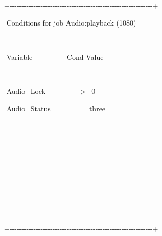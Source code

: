 \begin{exparasmall}

\ +-{}-{}-{}-{}-{}-{}-{}-{}-{}-{}-{}-{}-{}-{}-{}-{}-{}-{}-{}-{}-{}-{}-{}-{}-{}-{}-{}-{}-{}-{}-{}-{}-{}-{}-{}-{}-{}-{}-{}-{}-{}-{}-{}-{}-{}-{}-{}-{}-{}-{}-{}-{}-{}-{}-{}-{}-{}-{}-{}-+

\ {\textbar} Conditions for job
{\textasciigrave}Audio:playback{\textquotesingle} (1080)
\ \ \ \ \ \ \ \ \ \ \ \ \ \ \ \ {\textbar}

\ {\textbar}
\ \ \ \ \ \ \ \ \ \ \ \ \ \ \ \ \ \ \ \ \ \ \ \ \ \ \ \ \ \ \ \ \ \ \ \ \ \ \ \ \ \ \ \ \ \ \ \ \ \ \ \ \ \ \ \ \ \ \ {\textbar}

\ {\textbar} Variable \ \ \ \ \ \ \ \ \ Cond Value
\ \ \ \ \ \ \ \ \ \ \ \ \ \ \ \ \ \ \ \ \ \ \ \ \ \ \ \ \ \ {\textbar}

\ {\textbar}
\ \ \ \ \ \ \ \ \ \ \ \ \ \ \ \ \ \ \ \ \ \ \ \ \ \ \ \ \ \ \ \ \ \ \ \ \ \ \ \ \ \ \ \ \ \ \ \ \ \ \ \ \ \ \ \ \ \ \ {\textbar}

\ {\textbar} Audio\_Lock \ \ \ \ \ \ \ \ \ {\textgreater} \ 0
\ \ \ \ \ \ \ \ \ \ \ \ \ \ \ \ \ \ \ \ \ \ \ \ \ \ \ \ \ \ \ \ \ \ {\textbar}

\ {\textbar} Audio\_Status \ \ \ \ \ \ \ =
\ {\textquotedbl}three{\textquotedbl}
\ \ \ \ \ \ \ \ \ \ \ \ \ \ \ \ \ \ \ \ \ \ \ \ \ \ \ \ {\textbar}

\ {\textbar}
\ \ \ \ \ \ \ \ \ \ \ \ \ \ \ \ \ \ \ \ \ \ \ \ \ \ \ \ \ \ \ \ \ \ \ \ \ \ \ \ \ \ \ \ \ \ \ \ \ \ \ \ \ \ \ \ \ \ \ {\textbar}

\ {\textbar}
\ \ \ \ \ \ \ \ \ \ \ \ \ \ \ \ \ \ \ \ \ \ \ \ \ \ \ \ \ \ \ \ \ \ \ \ \ \ \ \ \ \ \ \ \ \ \ \ \ \ \ \ \ \ \ \ \ \ \ {\textbar}

\ {\textbar}
\ \ \ \ \ \ \ \ \ \ \ \ \ \ \ \ \ \ \ \ \ \ \ \ \ \ \ \ \ \ \ \ \ \ \ \ \ \ \ \ \ \ \ \ \ \ \ \ \ \ \ \ \ \ \ \ \ \ \ {\textbar}

\ {\textbar}
\ \ \ \ \ \ \ \ \ \ \ \ \ \ \ \ \ \ \ \ \ \ \ \ \ \ \ \ \ \ \ \ \ \ \ \ \ \ \ \ \ \ \ \ \ \ \ \ \ \ \ \ \ \ \ \ \ \ \ {\textbar}

\ {\textbar}
\ \ \ \ \ \ \ \ \ \ \ \ \ \ \ \ \ \ \ \ \ \ \ \ \ \ \ \ \ \ \ \ \ \ \ \ \ \ \ \ \ \ \ \ \ \ \ \ \ \ \ \ \ \ \ \ \ \ \ {\textbar}

\ {\textbar}
\ \ \ \ \ \ \ \ \ \ \ \ \ \ \ \ \ \ \ \ \ \ \ \ \ \ \ \ \ \ \ \ \ \ \ \ \ \ \ \ \ \ \ \ \ \ \ \ \ \ \ \ \ \ \ \ \ \ \ {\textbar}

\ +-{}-{}-{}-{}-{}-{}-{}-{}-{}-{}-{}-{}-{}-{}-{}-{}-{}-{}-{}-{}-{}-{}-{}-{}-{}-{}-{}-{}-{}-{}-{}-{}-{}-{}-{}-{}-{}-{}-{}-{}-{}-{}-{}-{}-{}-{}-{}-{}-{}-{}-{}-{}-{}-{}-{}-{}-{}-{}-{}-+

\end{exparasmall}

